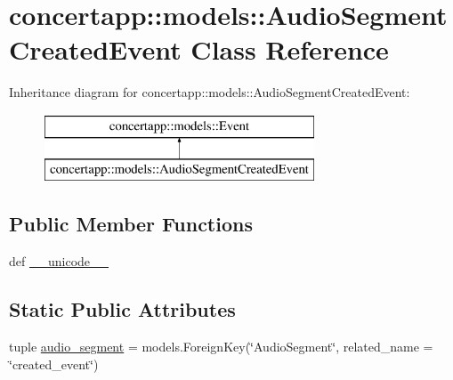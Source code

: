 \hypertarget{classconcertapp_1_1models_1_1_audio_segment_created_event}{
\section{concertapp::models::AudioSegmentCreatedEvent Class Reference}
\label{classconcertapp_1_1models_1_1_audio_segment_created_event}
}
Inheritance diagram for concertapp::models::AudioSegmentCreatedEvent:\begin{figure}[H]
\begin{center}
\leavevmode
\includegraphics[height=2.000000cm]{classconcertapp_1_1models_1_1_audio_segment_created_event}
\end{center}
\end{figure}
\subsection*{Public Member Functions}
\begin{DoxyCompactItemize}
\item 
def \hyperlink{classconcertapp_1_1models_1_1_audio_segment_created_event_aec9824a08530356eb1614bf40fcc3b93}{\_\-\_\-unicode\_\-\_\-}
\end{DoxyCompactItemize}
\subsection*{Static Public Attributes}
\begin{DoxyCompactItemize}
\item 
tuple \hyperlink{classconcertapp_1_1models_1_1_audio_segment_created_event_abdad18f9f994c2ea48e6aa6253382be7}{audio\_\-segment} = models.ForeignKey(\char`\"{}AudioSegment\char`\"{}, related\_\-name = \char`\"{}created\_\-event\char`\"{})
\end{DoxyCompactItemize}


